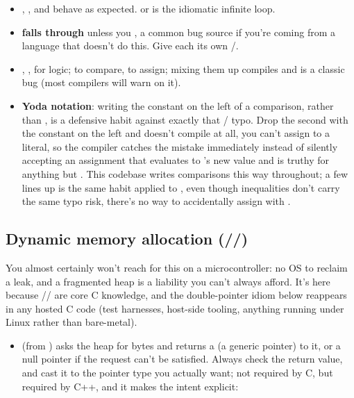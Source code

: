 \begin{itemize}
  \item {}, , and  behave as expected.  or
     is the idiomatic infinite loop.
  \item {} \textbf{falls through} unless you , a common bug source if you're
    coming from a language that doesn't do this. Give each  its own
    /.
  \item \code{&&}, \code{||}, \code{!} for logic; \code{==} to compare, \code{=} to assign; mixing
    them up compiles and is a classic bug (most compilers will warn on it).
  \item \textbf{Yoda notation}: writing the constant on the left of a comparison, 
    rather than , is a defensive habit against exactly that \code{==}/\code{=}
    typo. Drop the second \code{=} with the constant on the left and  doesn't
    compile at all, you can't assign to a literal, so the compiler catches the mistake immediately
    instead of silently accepting an assignment that evaluates to 's new value and is
    truthy for anything but . This codebase writes comparisons this way throughout;
     a few lines up is the same habit applied to \code{>}, even though
    inequalities don't carry the same typo risk, there's no way to accidentally assign with
    \code{>}.
\end{itemize}

\subsection{Dynamic memory allocation (//)}
\label{c1:a:11}
You almost certainly won't reach for this on a microcontroller: no OS to reclaim a leak, and a
fragmented heap is a liability you can't always afford. It's here because
// are core C knowledge, and the double-pointer idiom
below reappears in any hosted C code (test harnesses, host-side tooling, anything running under
Linux rather than bare-metal).
\begin{itemize}
  \item {} (from ) asks the heap for  bytes and returns
    a  (a generic pointer) to it, or a null pointer if the request can't be satisfied.
    Always check the return value, and cast it to the pointer type you actually want; not required
    by C, but required by C++, and it makes the intent explicit:
\end{itemize}

